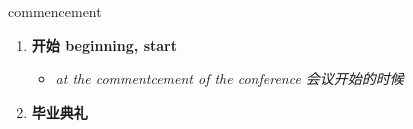 
\begin{frame}
{\huge commencement}
\begin{center}
\begin{enumerate}\Large
  \item \textbf{开始 beginning, start}
  \begin{itemize}
    \item \em{\Large{at the commentcement of the conference 会议开始的时候}}
  \end{itemize}
  \item \textbf{毕业典礼}
\end{enumerate}
\end{center}
\end{frame}
